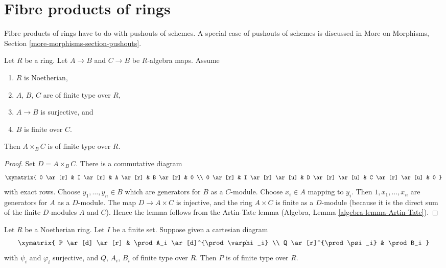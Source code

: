 \section{Fibre products of rings}
\label{section-fibre-products-rings}

\noindent
Fibre products of rings have to do with pushouts of schemes. A special
case of pushouts of schemes is discussed in
More on Morphisms, Section \ref{more-morphisms-section-pushouts}.

\begin{lemma}
\label{lemma-fibre-product-finite-type}
Let $R$ be a ring. Let $A \to B$ and $C \to B$ be $R$-algebra maps.
Assume
\begin{enumerate}
\item $R$ is Noetherian,
\item $A$, $B$, $C$ are of finite type over $R$,
\item $A \to B$ is surjective, and
\item $B$ is finite over $C$.
\end{enumerate}
Then $A \times_B C$ is of finite type over $R$.
\end{lemma}

\begin{proof}
Set $D = A \times_B C$. There is a commutative diagram
$$
\xymatrix{
0 \ar[r] &
I \ar[r] &
A \ar[r] &
B \ar[r] &
0 \\
0 \ar[r] &
I \ar[r] \ar[u] &
D \ar[r] \ar[u] &
C \ar[r] \ar[u] &
0
}
$$
with exact rows. Choose $y_1, \ldots, y_n \in B$ which are generators for
$B$ as a $C$-module. Choose $x_i \in A$ mapping to $y_i$.
Then $1, x_1, \ldots, x_n$ are generators for $A$ as a $D$-module.
The map $D \to A \times C$ is injective, and the ring $A \times C$ is finite
as a $D$-module (because it is the direct sum of the finite $D$-modules
$A$ and $C$). Hence the lemma follows from the Artin-Tate lemma
(Algebra, Lemma \ref{algebra-lemma-Artin-Tate}).
\end{proof}

\begin{lemma}
\label{lemma-formal-consequence}
Let $R$ be a Noetherian ring. Let $I$ be a finite set. Suppose given a
cartesian diagram
$$
\xymatrix{
P \ar[d] \ar[r] & \prod A_i \ar[d]^{\prod \varphi_i} \\
Q \ar[r]^{\prod \psi_i} & \prod B_i
}
$$
with $\psi_i$ and $\varphi_i$ surjective, and $Q$, $A_i$, $B_i$ of
finite type over $R$. Then $P$ is of finite type over $R$.
\end{lemma}

